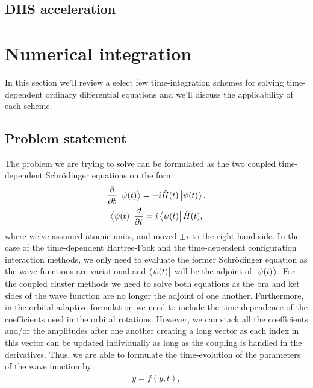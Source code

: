         \subsection{DIIS acceleration}
    \section{Numerical integration}
        In this section we'll review a select few time-integration schemes for
        solving time-dependent ordinary differential equations and we'll discuss the
        applicability of each scheme.

        \subsection{Problem statement}
            The problem we are trying to solve can be formulated as the
            two coupled time-dependent Schrödinger equations on the form
            \begin{gather}
                \dpd{}{t}\ket{\psi(t)}
                = -i\hamil(t)\ket{\psi(t)},
                \\
                \bra{\psi(t)}\dpd{}{t}
                = i\bra{\psi(t)}\hamil(t),
            \end{gather}
            where we've assumed atomic units, and moved $\pm i$ to the right-hand
            side.
            In the case of the time-dependent Hartree-Fock and the
            time-dependent configuration interaction methods, we only need to
            evaluate the former Schrödinger equation as the wave functions are
            variational and $\bra{\psi(t)}$ will be the adjoint of
            $\ket{\psi(t)}$.
            For the coupled cluster methods we need to solve both equations as
            the bra and ket sides of the wave function are no longer the adjoint
            of one another.
            Furthermore, in the orbital-adaptive formulation we need to include
            the time-dependence of the coefficients used in the orbital
            rotations.
            However, we can stack all the coefficients and/or the amplitudes
            after one another creating a long vector as each index in this
            vector can be updated individually as long as the coupling is
            handled in the derivatives.
            Thus, we are able to formulate the time-evolution of the
            parameters of the wave function by
            \begin{align}
                \dot{y} = f(y, t),
            \end{align}
